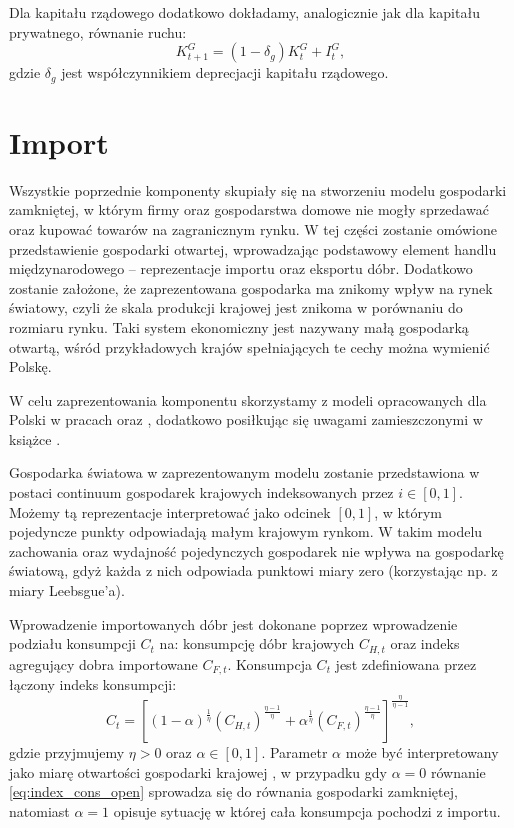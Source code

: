 Dla kapitału rządowego dodatkowo dokładamy, analogicznie jak dla kapitału prywatnego, równanie ruchu:
\begin{equation}
    K_{t+1}^G = (1 - \delta_g)K_{t}^{G} + I_t^G,
\end{equation}
gdzie $\delta_g$ jest współczynnikiem deprecjacji kapitału rządowego.

\section{Import}

Wszystkie poprzednie komponenty skupiały się na stworzeniu modelu gospodarki zamkniętej, w którym firmy oraz gospodarstwa domowe nie mogły sprzedawać oraz kupować towarów na zagranicznym rynku. W tej części zostanie omówione przedstawienie gospodarki otwartej, wprowadzając podstawowy element handlu międzynarodowego -- reprezentacje importu oraz eksportu dóbr. Dodatkowo zostanie założone, że zaprezentowana gospodarka ma znikomy wpływ na rynek światowy, czyli że skala produkcji krajowej jest znikoma w porównaniu do rozmiaru rynku. Taki system ekonomiczny jest nazywany małą gospodarką otwartą, wśród przykładowych krajów spełniających te cechy można wymienić Polskę.

W celu zaprezentowania komponentu skorzystamy z modeli opracowanych dla Polski w pracach \cite{grabek2007soe} oraz \cite{nbpKoloch}, dodatkowo posiłkując się uwagami zamieszczonymi w książce \cite{gali}.

Gospodarka światowa w zaprezentowanym modelu zostanie przedstawiona w postaci continuum gospodarek krajowych indeksowanych przez $i \in [0, 1]$. Możemy tą reprezentacje interpretować jako odcinek $[0,1]$, w którym pojedyncze punkty odpowiadają małym krajowym rynkom. W takim modelu zachowania oraz wydajność pojedynczych gospodarek nie wpływa na gospodarkę światową, gdyż każda z nich odpowiada punktowi miary zero (korzystając np. z miary Leebsgue'a). 

Wprowadzenie importowanych dóbr jest dokonane poprzez wprowadzenie podziału konsumpcji $C_t$ na: konsumpcję dóbr krajowych $C_{H,t}$ oraz indeks agregujący dobra importowane $C_{F,t}$. Konsumpcja $C_t$ jest zdefiniowana przez łączony indeks konsumpcji:
\begin{equation}
    \label{eq:index_cons_open}
    C_t = [(1 - \alpha)^{\frac{1}{\eta}}(C_{H,t})^{\frac{\eta-1}{\eta}} + \alpha^{\frac{1}{\eta}}(C_{F,t})^{\frac{\eta-1}{\eta}}]^{\frac{\eta}{\eta-1}},
\end{equation}
gdzie przyjmujemy $\eta > 0$ oraz $\alpha \in [0,1]$. Parametr $\alpha$ może być interpretowany jako miarę otwartości gospodarki krajowej \cite{nbpKoloch}, w przypadku gdy $\alpha = 0$ równanie \eqref{eq:index_cons_open} sprowadza się do równania gospodarki zamkniętej, natomiast $\alpha = 1$ opisuje sytuację w której cała konsumpcja pochodzi z importu.

